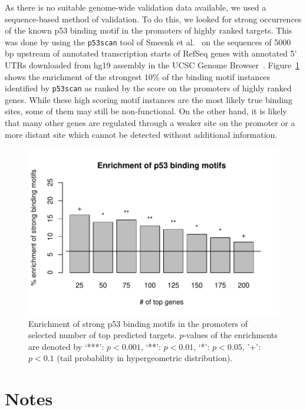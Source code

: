 \documentclass[11pt]{article}
\begin{document}
As there is no suitable genome-wide validation data available, we used
a sequence-based method of validation.  To do this, we looked for
strong occurrences of the known p53 binding motif in the promoters of
highly ranked targets.  This was done by using the \texttt{p53scan}
tool of Smeenk et al.~\cite{Smeenk2008} on the sequences of 5000 bp
upstream of annotated transcription starts of RefSeq genes with
annotated 5' UTRs downloaded from hg19 assembly in the UCSC Genome
Browser~\cite{Fujita2011}.  Figure~\ref{fig:p53_validation} shows the
enrichment of the strongest $10 \%$ of the binding motif instances
identified by \texttt{p53scan} as ranked by the score on the promoters
of highly ranked genes.  While these high scoring motif instances are
the most likely true binding sites, some of them may still be
non-functional.  On the other hand, it is likely that many other genes
are regulated through a weaker site on the promoter or a more distant
site which cannot be detected without additional information.

\begin{figure}[htb]
  \centering
  \includegraphics[width=.7\textwidth]{p53_validation}
  \caption{Enrichment of strong p53 binding motifs in the promoters of
    selected number of top predicted targets.  $p$-values of the
    enrichments are denoted by `***': $p < 0.001$, `**': $p < 0.01$,
    `*': $p < 0.05$, '+': $p < 0.1$ (tail probability in
    hypergeometric distribution).}
  \label{fig:p53_validation}
\end{figure}

\section{Notes}
\end{document}
